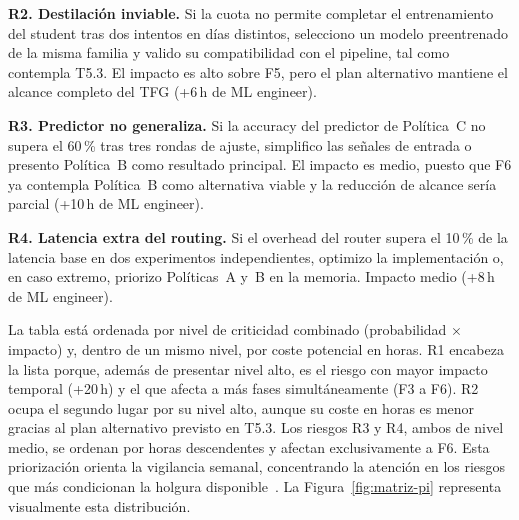\textbf{R2. Destilación inviable.} Si la cuota no permite completar el entrenamiento del student tras dos intentos en días distintos, selecciono un modelo preentrenado de la misma familia y valido su compatibilidad con el pipeline, tal como contempla T5.3. El impacto es alto sobre F5, pero el plan alternativo mantiene el alcance completo del TFG (+6\,h de ML engineer).

\textbf{R3. Predictor no generaliza.} Si la accuracy del predictor de Política~C no supera el 60\,\% tras tres rondas de ajuste, simplifico las señales de entrada o presento Política~B como resultado principal. El impacto es medio, puesto que F6 ya contempla Política~B como alternativa viable y la reducción de alcance sería parcial (+10\,h de ML engineer).

\textbf{R4. Latencia extra del routing.} Si el overhead del router supera el 10\,\% de la latencia base en dos experimentos independientes, optimizo la implementación o, en caso extremo, priorizo Políticas~A y~B en la memoria. Impacto medio (+8\,h de ML engineer).

La tabla está ordenada por nivel de criticidad combinado (probabilidad $\times$ impacto) y, dentro de un mismo nivel, por coste potencial en horas. R1 encabeza la lista porque, además de presentar nivel alto, es el riesgo con mayor impacto temporal (+20\,h) y el que afecta a más fases simultáneamente (F3 a F6). R2 ocupa el segundo lugar por su nivel alto, aunque su coste en horas es menor gracias al plan alternativo previsto en T5.3. Los riesgos R3 y R4, ambos de nivel medio, se ordenan por horas descendentes y afectan exclusivamente a F6. Esta priorización orienta la vigilancia semanal, concentrando la atención en los riesgos que más condicionan la holgura disponible~\cite{pmbok}. La Figura~\ref{fig:matriz-pi} representa visualmente esta distribución.

